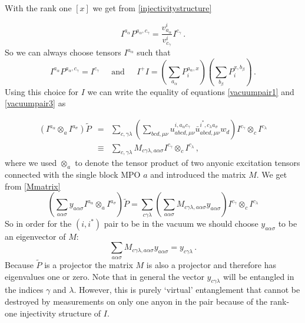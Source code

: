 \documentclass[12 pt]{article}
\begin{document}
With the rank one $[x]$ we get from \eqref{injectivitystructure}

\begin{equation}
    I^{a_\alpha}P^{a_\alpha,c_\gamma} = \frac{v^i_{a_\alpha}}{v^i_{c_\gamma}}I^{c_\gamma}\, .
\end{equation}
So we can always choose tensors $I^{a_\alpha}$ such that
\begin{equation}
    I^{a_\alpha}P^{a_\alpha,c_\gamma} =I^{c_\gamma}\;\;\;\;\text{ and }\;\;\;\; I^+I=\left(\sum_{a_\alpha}P_i^{a_\alpha,x}\right)\left( \sum_{b_\beta} P^{x,b_\beta}_i \right)\, .
\end{equation}
Using this choice for $I$ we can write the equality of equations \eqref{vacuumpair1} and \eqref{vacuumpair3} as

\begin{eqnarray}
    \left(I^{a_\alpha}\otimes_a I^{a_\sigma} \right)\tilde{P} & =& \sum_{c,\gamma\lambda} \left( \sum_{bcd,\mu\nu} u^{i,a_\alpha c_\gamma}_{abcd,\mu\nu} \bar{u}^{i^*,c_\lambda a_\sigma}_{abcd,\mu\nu}  w_d\right) I^{c_\gamma} \otimes_c I^{c_\lambda}  \\
    & \equiv & \sum_{c,\gamma\lambda} M_{c\gamma\lambda,a\alpha\sigma} I^{c_\gamma} \otimes_c I^{c_\lambda} \, , \label{Mmatrix}
\end{eqnarray}
where we used $\otimes_a$ to denote the tensor product of two anyonic excitation tensors connected with the single block MPO $a$ and introduced the matrix $M$. We get from \eqref{Mmatrix}
\begin{equation}
    \left(\sum_{a\alpha\sigma} y_{a\alpha\sigma} I^{a_\alpha}\otimes_a I^{a_\sigma} \right)\tilde{P} = \sum_{c\gamma\lambda}\left(\sum_{a\alpha\sigma} M_{c\gamma\lambda, a\alpha\sigma}y_{a\alpha\sigma}\right) I^{c_\gamma} \otimes_c I^{c_\lambda}
\end{equation}
So in order for the $(i,i^*)$ pair to be in the vacuum we should choose $y_{a\alpha\sigma}$ to be an eigenvector of $M$:
\begin{equation}
    \sum_{a\alpha\sigma} M_{c\gamma\lambda, a\alpha\sigma}y_{a\alpha\sigma}  = y_{c\gamma\lambda}\, .
\end{equation}
Because $\tilde{P}$ is a projector the matrix $M$ is also a projector and therefore has eigenvalues one or zero. Note that in general the vector $y_{c\gamma\lambda}$ will be entangled in the indices $\gamma$ and $\lambda$. However, this is purely `virtual' entanglement that cannot be destroyed by measurements on only one anyon in the pair because of the rank-one injectivity structure of $I$.
\end{document}
